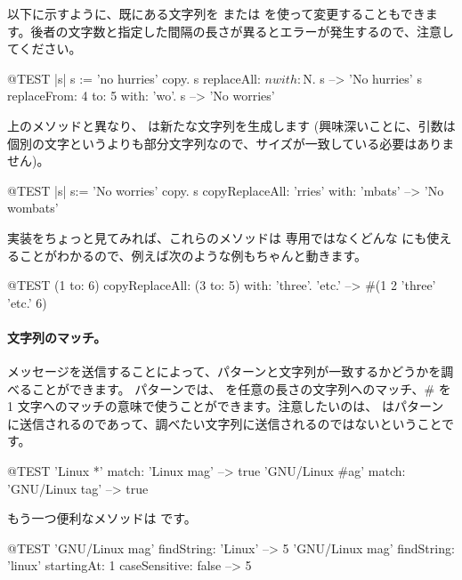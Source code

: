 \documentclass[a4paper,10pt,twoside]{book}
\begin{document}
以下に示すように、既にある文字列を  または  を使って変更することもできます。後者の文字数と指定した間隔の長さが異るとエラーが発生するので、注意してください。

\begin{code}{@TEST |s| s := 'no hurries' copy.}
s replaceAll: $n with: $N.
s --> 'No hurries'
s replaceFrom: 4 to: 5 with: 'wo'.
s --> 'No worries'
\end{code}

上のメソッドと異なり、 は新たな文字列を生成します
(興味深いことに、引数は個別の文字というよりも部分文字列なので、サイズが一致している必要はありません)。

\begin{code}{@TEST |s| s:= 'No worries' copy.}
s copyReplaceAll: 'rries' with: 'mbats' --> 'No wombats'
\end{code}

実装をちょっと見てみれば、これらのメソッドは  専用ではなくどんな  にも使えることがわかるので、例えば次のような例もちゃんと動きます。

\begin{code}{@TEST}
(1 to: 6) copyReplaceAll: (3 to: 5) with: { 'three'. 'etc.' } --> #(1 2 'three' 'etc.' 6)
\end{code}

\paragraph{文字列のマッチ。}
 メッセージを送信することによって、パターンと文字列が一致するかどうかを調べることができます。
パターンでは、\ct{*} を任意の長さの文字列へのマッチ、\# を 1 文字へのマッチの意味で使うことができます。注意したいのは、 はパターンに送信されるのであって、調べたい文字列に送信されるのではないということです。
\begin{code}{@TEST}
'Linux *' match: 'Linux mag'                      --> true
'GNU/Linux #ag' match: 'GNU/Linux tag' --> true
\end{code}

もう一つ便利なメソッドは  です。
\begin{code}{@TEST}
'GNU/Linux mag' findString: 'Linux'                                                      --> 5
'GNU/Linux mag' findString: 'linux' startingAt: 1 caseSensitive: false  --> 5
\end{code}
\end{document}
